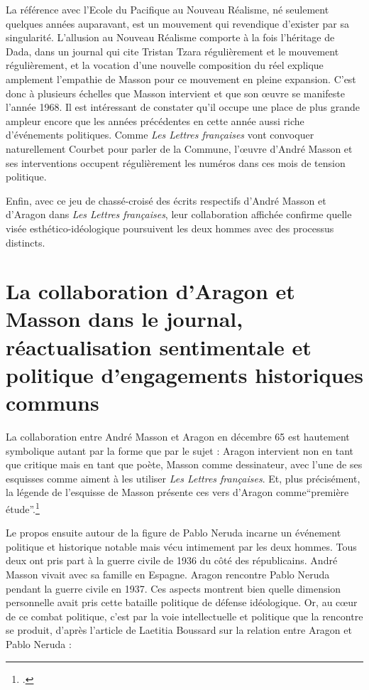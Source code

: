 	La référence avec l’Ecole du Pacifique au Nouveau Réalisme, né seulement quelques années auparavant, est un mouvement qui revendique d’exister par sa singularité. L’allusion au Nouveau Réalisme comporte à la fois l’héritage de Dada, dans un journal qui cite Tristan Tzara régulièrement et le mouvement régulièrement, et la vocation d’une nouvelle composition du réel explique amplement l’empathie de Masson pour ce mouvement en pleine expansion. C’est donc à plusieurs échelles que Masson intervient et que son \oe{}uvre se manifeste l’année 1968. Il est intéressant de constater qu’il occupe une place de plus grande ampleur encore que les années précédentes en cette année aussi riche d’événements politiques. Comme \emph{Les Lettres françaises} vont convoquer naturellement Courbet pour parler de la Commune, l’\oe{}uvre d’André Masson et ses interventions occupent régulièrement les numéros dans ces mois de tension politique. 

	Enfin, avec ce jeu de chassé-croisé des écrits respectifs d’André Masson et d’Aragon dans \emph{Les Lettres françaises}, leur collaboration affichée confirme quelle visée esthético-idéologique poursuivent les deux hommes avec des processus distincts.

\section{La collaboration d’Aragon et Masson dans le journal, réactualisation sentimentale et politique d’engagements historiques communs}

La collaboration entre André Masson et Aragon en décembre 65 est hautement symbolique autant par la forme que par le sujet : Aragon intervient non en tant que critique mais en tant que poète, Masson comme dessinateur, avec l’une de ses esquisses comme aiment à les utiliser \emph{Les Lettres françaises}. Et, plus précisément, la légende de l’esquisse de Masson présente ces vers d’Aragon comme\enquote{première étude}.\footcite{pabloneruda}

	 Le propos ensuite autour de la figure de Pablo Neruda incarne un événement politique et historique notable mais vécu intimement par les deux hommes. Tous deux ont pris part à la guerre civile de 1936 du côté des républicains. André Masson vivait avec sa famille en Espagne. Aragon rencontre Pablo Neruda pendant la guerre civile en 1937. Ces aspects montrent bien quelle dimension personnelle avait pris cette bataille politique de défense idéologique. Or, au c\oe{}ur de ce combat politique, c’est par la voie intellectuelle et politique que la rencontre se produit, d’après l’article de Laetitia Boussard sur la relation entre Aragon et Pablo Neruda :


